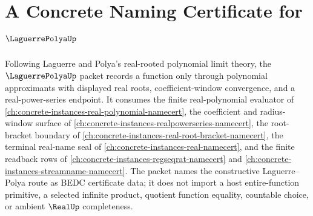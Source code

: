 \chapter{A Concrete Naming Certificate for $\LaguerrePolyaUp$}
\label{ch:concrete-instances-laguerre-polya-namecert}

Following Laguerre and Polya's real-rooted polynomial limit theory, the $\LaguerrePolyaUp$ packet records a function only through polynomial approximants with displayed real roots, coefficient-window convergence, and a real-power-series endpoint. It consumes the finite real-polynomial evaluator of \autoref{ch:concrete-instances-real-polynomial-namecert}, the coefficient and radius-window surface of \autoref{ch:concrete-instances-realpowerseries-namecert}, the root-bracket boundary of \autoref{ch:concrete-instances-real-root-bracket-namecert}, the terminal real-name seal of \autoref{ch:concrete-instances-real-namecert}, and the finite readback rows of \autoref{ch:concrete-instances-regseqrat-namecert} and \autoref{ch:concrete-instances-streamname-namecert}. The packet names the constructive Laguerre--Polya route as BEDC certificate data; it does not import a host entire-function primitive, a selected infinite product, quotient function equality, countable choice, or ambient $\RealUp$ completeness.

